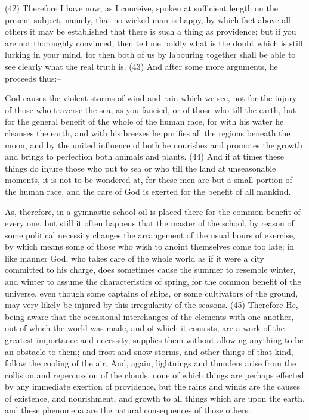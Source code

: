 (42) Therefore I have now, as I conceive, spoken at sufficient length on the present subject,
namely, that no wicked man is happy, by which fact above all others it may be established that
there is such a thing as providence; but if you are not thoroughly convinced, then tell me boldly what
is the doubt which is still lurking in your mind, for then both of us by labouring together shall be able
to see clearly what the real truth is. (43) And after some more arguments, he proceeds thus:--

God causes the violent storms of wind and rain which we see, not for the injury of those who
traverse the sea, as you fancied, or of those who till the earth, but for the general benefit of the
whole of the human race, for with his water he cleanses the earth, and with his breezes he purifies
all the regions beneath the moon, and by the united influence of both he nourishes and promotes
the growth and brings to perfection both animals and plants. (44) And if at times these things do
injure those who put to sea or who till the land at unseasonable moments, it is not to be wondered
at, for these men are but a small portion of the human race, and the care of God is exerted for the
benefit of all mankind.

As, therefore, in a gymnastic school oil is placed there for the common benefit of every one, but
still it often happens that the master of the school, by reason of some political necessity changes
the arrangement of the usual hours of exercise, by which means some of those who wish to anoint
themselves come too late; in like manner God, who takes care of the whole world as if it were a city
committed to his charge, does sometimes cause the summer to resemble winter, and winter to
assume the characteristics of spring, for the common benefit of the universe, even though some
captains of ships, or some cultivators of the ground, may very likely be injured by this irregularity of
the seasons. (45) Therefore He, being aware that the occasional interchanges of the elements
with one another, out of which the world was made, and of which it consists, are a work of the
greatest importance and necessity, supplies them without allowing anything to be an obstacle to
them; and frost and snow-storms, and other things of that kind, follow the cooling of the air. And,
again, lightnings and thunders arise from the collision and repercussion of the clouds, none of
which things are perhaps effected by any immediate exertion of providence, but the rains and
winds are the causes of existence, and nourishment, and growth to all things which are upon the
earth, and these phenomena are the natural consequences of those others.

